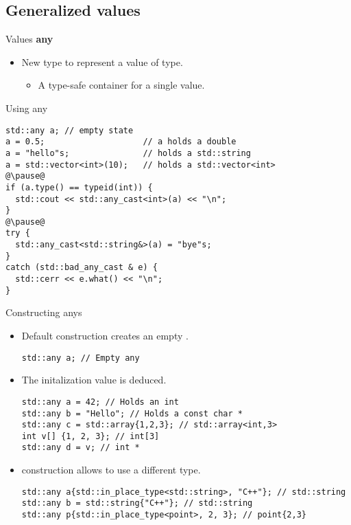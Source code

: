 \subsection{Generalized values}

\begin{frame}[t,fragile]{Values \textbf{any}}
\begin{itemize}
  \item New  type to represent a value of  type.
    \begin{itemize}
      \item A type-safe container for a single value.
    \end{itemize}
\end{itemize}
\begin{block}{Using any}
\begin{lstlisting}[escapechar=@]
std::any a; // empty state
a = 0.5;                    // a holds a double
a = "hello"s;               // holds a std::string
a = std::vector<int>(10);   // holds a std::vector<int> 
@\pause@
if (a.type() == typeid(int)) {
  std::cout << std::any_cast<int>(a) << "\n";
}
@\pause@
try {
  std::any_cast<std::string&>(a) = "bye"s;
}
catch (std::bad_any_cast & e) {
  std::cerr << e.what() << "\n";
}
\end{lstlisting}
\end{block}
\end{frame}

\begin{frame}[t,fragile]{Constructing anys}
\begin{itemize}
  \item Default construction creates an empty .
\begin{lstlisting}
std::any a; // Empty any
\end{lstlisting}

  \item The initalization value is deduced.
\begin{lstlisting}
std::any a = 42; // Holds an int
std::any b = "Hello"; // Holds a const char *
std::any c = std::array{1,2,3}; // std::array<int,3>
int v[] {1, 2, 3}; // int[3]
std::any d = v; // int *
\end{lstlisting}

  \item {} construction allows to use a different type.
\begin{lstlisting}
std::any a{std::in_place_type<std::string>, "C++"}; // std::string
std::any b = std::string{"C++"}; // std::string
std::any p{std::in_place_type<point>, 2, 3}; // point{2,3}
\end{lstlisting}

\end{itemize}
\end{frame}

